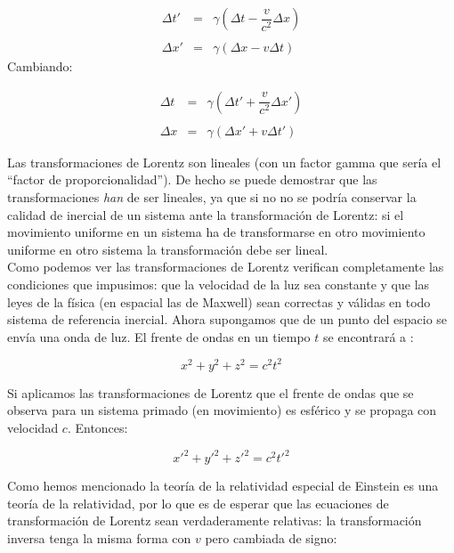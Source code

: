 \documentclass[12pt,a4paper]{book}
\newcommand{\parentesis}[1]{\left( #1  \right)}
\begin{document}
\begin{equation}
\begin{array}{rll}
\Delta t' & = & \gamma \parentesis{  \Delta t - \dfrac{v}{c^2}  \Delta x} \\ \\
\Delta x' & = & \gamma \parentesis{\Delta x - v\Delta t}
\end{array} 
\end{equation}
Cambiando:

\begin{equation}
\begin{array}{rll}
\Delta t & = & \gamma \parentesis{  \Delta t' + \dfrac{v}{c^2}  \Delta x'} \\ \\
\Delta x & = & \gamma \parentesis{\Delta x' + v\Delta t'}
\end{array} 
\end{equation}

  Las transformaciones de Lorentz son lineales (con un factor gamma que sería el ``factor de proporcionalidad''). De hecho se puede demostrar que las transformaciones \textit{han} de ser lineales, ya que si no no se podría conservar la calidad de inercial de un sistema ante la transformación de Lorentz: si el movimiento uniforme en un sistema ha de transformarse en otro movimiento uniforme en otro sistema la transformación debe ser lineal. \\
  

Como podemos ver las transformaciones de Lorentz verifican completamente las condiciones que impusimos: que la velocidad de la luz sea constante y que las leyes de la física (en espacial las de Maxwell) sean correctas y válidas en todo sistema de referencia inercial. Ahora supongamos que de un punto del espacio se envía una onda de luz.  El frente de ondas en un tiempo $t$ se encontrará a :

\begin{equation}
x^2 + y^2 + z^2  = c^2 t^2
\end{equation}

Si aplicamos las transformaciones de Lorentz que el frente de ondas que se observa para un sistema primado (en movimiento) es esférico y se propaga con velocidad $c$. Entonces:

\begin{equation}
x'^2 + y'^2 + z'^2 = c^2 t'^2
\end{equation}

Como hemos mencionado la teoría de la relatividad especial de Einstein es una teoría de la relatividad, por lo que es de esperar que las ecuaciones de transformación de Lorentz sean verdaderamente relativas: la transformación inversa tenga la misma forma con $v$ pero cambiada de signo:
\end{document}
